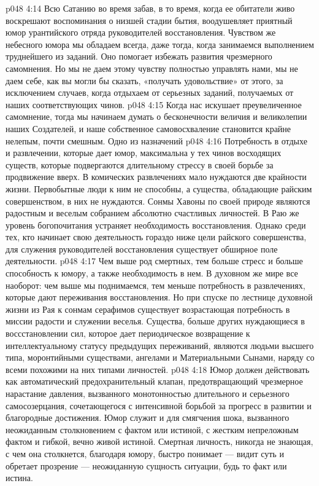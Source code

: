 \vs p048 4:14 \pc Всю Сатанию во время забав, в то время, когда ее обитатели живо воскрешают воспоминания о низшей стадии бытия, воодушевляет приятный юмор урантийского отряда руководителей восстановления. Чувством же небесного юмора мы обладаем всегда, даже тогда, когда занимаемся выполнением труднейшего из заданий. Оно помогает избежать развития чрезмерного самомнения. Но мы не даем этому чувству полностью управлять нами, мы не даем себе, как вы могли бы сказать, «получать удовольствие» от этого, за исключением случаев, когда отдыхаем от серьезных заданий, получаемых от наших соответствующих чинов.
\vs p048 4:15 Когда нас искушает преувеличенное самомнение, тогда мы начинаем думать о бесконечности величия и великолепии наших Создателей, и наше собственное самовосхваление становится крайне нелепым, почти смешным. Одно из назначений 
\vs p048 4:16 \pc Потребность в отдыхе и развлечении, которые дает юмор, максимальна у тех чинов восходящих существ, которые подвергаются длительному стрессу в своей борьбе за продвижение вверх. В комических развлечениях мало нуждаются две крайности жизни. Первобытные люди к ним не способны, а существа, обладающие райским совершенством, в них не нуждаются. Сонмы Хавоны по своей природе являются радостным и веселым собранием абсолютно счастливых личностей. В Раю же уровень богопочитания устраняет необходимость восстановления. Однако среди тех, кто начинает свою деятельность гораздо ниже цели райского совершенства, для служения руководителей восстановления существует обширное поле деятельности.
\vs p048 4:17 Чем выше род смертных, тем больше стресс и больше способность к юмору, а также необходимость в нем. В духовном же мире все наоборот: чем выше мы поднимаемся, тем меньше потребность в развлечениях, которые дают переживания восстановления. Но при спуске по лестнице духовной жизни из Рая к сонмам серафимов существует возрастающая потребность в миссии радости и служении веселья. Существа, больше других нуждающиеся в воссстановлении сил, которое дает периодическое возвращение к интеллектуальному статусу предыдущих переживаний, являются людьми высшего типа, моронтийными существами, ангелами и Материальными Сынами, наряду со всеми похожими на них типами личностей.
\vs p048 4:18 Юмор должен действовать как автоматический предохранительный клапан, предотвращающий чрезмерное нарастание давления, вызванного монотонностью длительного и серьезного самосозерцания, сочетающегося с интенсивной борьбой за прогресс в развитии и благородные достижения. Юмор служит и для смягчения шока, вызванного неожиданным столкновением с фактом или истиной, с жестким непреложным фактом и гибкой, вечно живой истиной. Смертная личность, никогда не знающая, с чем она столкнется, благодаря юмору, быстро понимает --- видит суть и обретает прозрение --- неожиданную сущность ситуации, будь то факт или истина.
